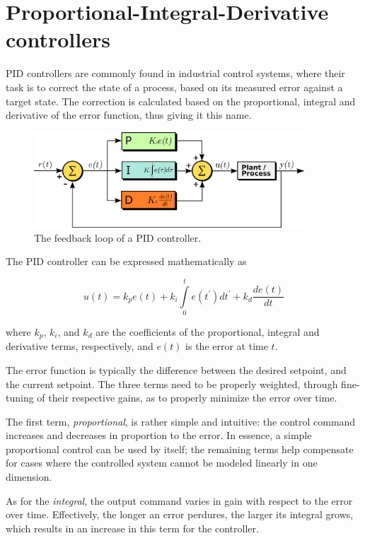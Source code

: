 \section{Proportional-Integral-Derivative controllers}

PID controllers are commonly found in industrial control systems, where their
task is to correct the state of a process, based on its measured error against
a target state. The correction is calculated based on the proportional,
integral and derivative of the error function, thus giving it this name.

\begin{figure}[h]
	\centering
	\includegraphics[width=0.9\textwidth]{figure/pid.png}
	\caption{The feedback loop of a PID controller.}
	\label{fig:pid-loop}
\end{figure}

The PID controller can be expressed mathematically as

\begin{equation}
	u(t) = k_p e(t) + k_i \int\limits_0^t e(t^{\prime}) dt^{\prime} + k_d \frac{de(t)}{dt}
\end{equation}

where $k_p$, $k_i$, and $k_d$ are the coefficients of the proportional,
integral and derivative terms, respectively, and $e(t)$ is the error at time
$t$.

The error function is typically the difference between the desired setpoint,
and the current setpoint. The three terms need to be properly weighted, through
fine-tuning of their respective gains, as to properly minimize the error
over time.

The first term, \emph{proportional}, is rather simple and intuitive: the
control command increases and decreases in proportion to the error. In essence,
a simple proportional control can be used by itself; the remaining terms help
compensate for cases where the controlled system cannot be modeled linearly
in one dimension.

As for the \emph{integral}, the output command varies in gain with respect to
the error over time. Effectively, the longer an error perdures, the larger its
integral grows, which results in an increase in this term for the controller.

